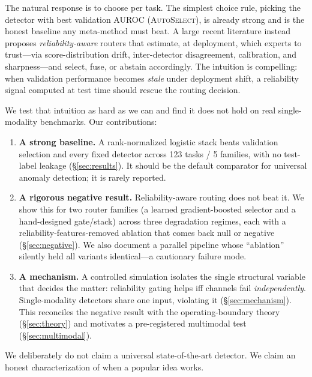 \documentclass[11pt]{article}
\newcommand{\auto}{\textsc{AutoSelect}}
\begin{document}
The natural response is to choose per task. The simplest choice rule, picking the
detector with best validation AUROC (\auto), is already strong and is the honest
baseline any meta-method must beat. A large recent literature instead proposes
\emph{reliability-aware} routers that estimate, at deployment, which experts to
trust---via score-distribution drift, inter-detector disagreement, calibration, and
sharpness---and select, fuse, or abstain accordingly. The intuition is compelling:
when validation performance becomes \emph{stale} under deployment shift, a reliability
signal computed at test time should rescue the routing decision.

We test that intuition as hard as we can and find it does not hold on real
single-modality benchmarks. Our contributions:
\begin{enumerate}
\item \textbf{A strong baseline.} A rank-normalized logistic stack beats validation
selection and every fixed detector across 123 tasks / 5 families, with no test-label
leakage (\S\ref{sec:results}). It should be the default comparator for universal
anomaly detection; it is rarely reported.
\item \textbf{A rigorous negative result.} Reliability-aware routing does not beat it.
We show this for two router families (a learned gradient-boosted selector and a
hand-designed gate/stack) across three degradation regimes, each with a
reliability-features-removed ablation that comes back null or negative
(\S\ref{sec:negative}). We also document a parallel pipeline whose ``ablation''
silently held all variants identical---a cautionary failure mode.
\item \textbf{A mechanism.} A controlled simulation isolates the single structural
variable that decides the matter: reliability gating helps iff channels fail
\emph{independently}. Single-modality detectors share one input, violating it
(\S\ref{sec:mechanism}). This reconciles the negative result with the operating-boundary
theory (\S\ref{sec:theory}) and motivates a pre-registered multimodal test
(\S\ref{sec:multimodal}).
\end{enumerate}
We deliberately do not claim a universal state-of-the-art detector. We claim an honest
characterization of when a popular idea works.
\end{document}
